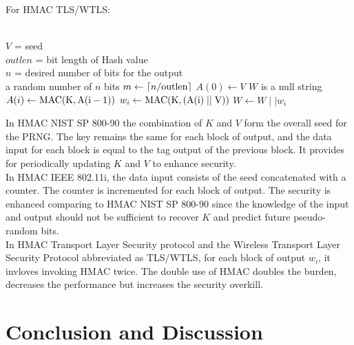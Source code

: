 \documentclass[12pt,a4paper,oneside]{report}
\begin{document}
For HMAC TLS/WTLS:
\begin{algorithm}
    \begin{algorithmic}
        \Require \\
        $V$ = seed\\
        $outlen$ = bit length of Hash value\\
        $n$ = desired number of bits for the output
        \Ensure \\
        a random number of $n$ bits
                \State $m \gets \lceil n/\rm{outlen} \rceil$ 
                \State $A(0) \gets V$ 
                \State $W$ is a null string
                    \State $A(i) \gets \rm{MAC}(K,A(i-1))$
                    \State $w_i \gets \rm{MAC}(K,(A(i)\mid \mid V))$  
                    \State $W \gets W \mid\mid w_i$  
                \EndFor
                \State {}  
        \EndFunction  
    \end{algorithmic}  
\end{algorithm}

\newpage
In HMAC NIST SP 800-90 the combination of $K$ and $V$ form the overall seed for the PRNG. The key remains the same for each block of output, and the data input for each block is equal to the tag output of the previous block. It provides for periodically updating $K$ and $V$ to enhance security.\\


In HMAC IEEE 802.11i, the data input consists of the seed concatenated with a counter. The counter is incremented for each block of output. The security is enhanced comparing to HMAC NIST SP 800-90 since the knowledge of the input and output should not be sufficient to recover $K$ and predict future pseudo-random bits.\\


In HMAC Transport Layer Security protocol and the Wireless Transport Layer Security Protocol abbreviated as TLS/WTLS, for each block of output $w_i$, it invloves invoking HMAC twice. The double use of HMAC doubles the burden, decreases the performance but increases the security overkill.\\


\chapter{  Conclusion and Discussion}
\end{document}
